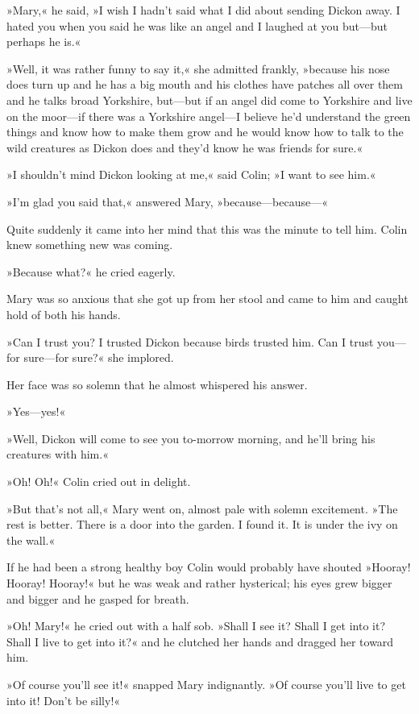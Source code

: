 »Mary,« he said, »I wish I hadn't said what I did about sending Dickon away. I hated you when you said he was like an angel and I laughed at you but—but perhaps he is.«

»Well, it was rather funny to say it,« she admitted frankly, »because his nose does turn up and he has a big mouth and his clothes have patches all over them and he talks broad Yorkshire, but—but if an angel did come to Yorkshire and live on the moor—if there was a Yorkshire angel—I believe he'd understand the green things and know how to make them grow and he would know how to talk to the wild creatures as Dickon does and they'd know he was friends for sure.«

»I shouldn't mind Dickon looking at me,« said Colin; »I want to see him.«

»I'm glad you said that,« answered Mary, »because—because—«

Quite suddenly it came into her mind that this was the minute to tell him. Colin knew something new was coming.

»Because what?« he cried eagerly.

Mary was so anxious that she got up from her stool and came to him and caught hold of both his hands.

»Can I trust you? I trusted Dickon because birds trusted him. Can I trust you—for sure—for sure?« she implored.

Her face was so solemn that he almost whispered his answer.

»Yes—yes!«

»Well, Dickon will come to see you to-morrow morning, and he'll bring his creatures with him.«

»Oh! Oh!« Colin cried out in delight.

»But that's not all,« Mary went on, almost pale with solemn excitement. »The rest is better. There is a door into the garden. I found it. It is under the ivy on the wall.«

If he had been a strong healthy boy Colin would probably have shouted »Hooray! Hooray! Hooray!« but he was weak and rather hysterical; his eyes grew bigger and bigger and he gasped for breath.

»Oh! Mary!« he cried out with a half sob. »Shall I see it? Shall I get into it? Shall I live to get into it?« and he clutched her hands and dragged her toward him.

»Of course you'll see it!« snapped Mary indignantly. »Of course you'll live to get into it! Don't be silly!«

